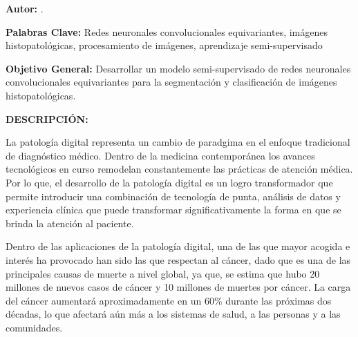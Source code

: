 \documentclass[12pt,letterpaper,final, openany]{scrbook}
\begin{document}
\textbf{Autor:} \Author.\footnotemark[2] 

\textbf{Palabras Clave:} Redes neuronales convolucionales equivariantes, imágenes histopatológicas, procesamiento de imágenes, aprendizaje semi-supervisado
 
\textbf{Objetivo General:} Desarrollar un modelo semi-supervisado de redes neuronales convolucionales equivariantes para la segmentación y clasificación de imágenes histopatológicas.

\textbf{DESCRIPCIÓN:}


La patología digital representa un cambio de paradgima en el enfoque tradicional de diagnóstico médico. Dentro de la medicina contemporánea los avances tecnológicos en curso remodelan constantemente las prácticas de atención médica. Por lo que, el desarrollo de la patología digital es un logro transformador que permite introducir una combinación de tecnología de punta, análisis de datos y experiencia clínica que puede transformar significativamente la forma en que se brinda la atención al paciente.

Dentro de las aplicaciones de la patología digital, una de las que mayor acogida e interés ha provocado han sido las que respectan al cáncer, dado que es una de las principales causas de muerte a nivel global, ya que, se estima que hubo 20 millones de nuevos casos de cáncer y 10 millones de muertes por cáncer. La carga del cáncer aumentará aproximadamente en un 60\% durante las próximas dos décadas, lo que afectará aún más a los sistemas de salud, a las personas y a las comunidades.
\end{document}
